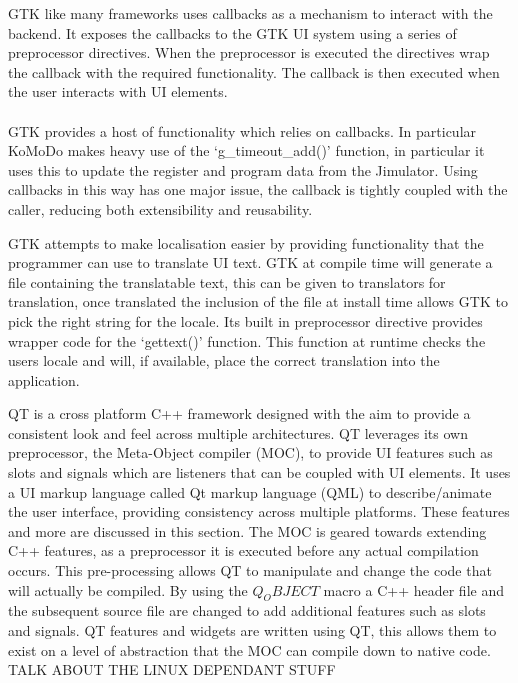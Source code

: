   GTK like many frameworks uses callbacks as a mechanism to interact with the backend. It exposes the callbacks to the GTK UI system using a series of preprocessor directives. When the preprocessor is executed the directives wrap the callback with the required functionality. The callback is then executed when the user interacts with UI elements.\\\\
  GTK provides a host of functionality which relies on callbacks. In particular KoMoDo makes heavy use of the `g\_timeout\_add()' function, in particular it uses this to update the register and program data from the Jimulator. Using callbacks in this way has one major issue, the callback is tightly coupled with the caller, reducing both extensibility and reusability.

  GTK attempts to make localisation easier by providing functionality that the programmer can use to translate UI text. GTK at compile time will generate a file containing the translatable text, this can be given to translators for translation, once translated the inclusion of the file at install time allows GTK to pick the right string for the locale. Its built in preprocessor directive provides wrapper code for the `gettext()' function. This function at runtime checks the users locale and will, if available, place the correct translation into the application.


  QT is a cross platform C++ framework designed with the aim to provide a consistent look and feel across multiple architectures. QT leverages its own preprocessor, the Meta-Object compiler (MOC), to provide UI features such as slots and signals which are listeners that can be coupled with UI elements. It uses a UI markup language called Qt markup language (QML) to describe/animate the user interface, providing consistency across multiple platforms. These features and more are discussed in this section.
  The MOC is geared towards extending C++ features, as a preprocessor it is executed before any actual compilation occurs. This pre-processing allows QT to manipulate and change the code that will actually be compiled. By using the $Q_OBJECT$ macro a C++ header file and the subsequent source file are changed to add additional features such as slots and signals. QT features and widgets are written using QT, this allows them to exist on a level of abstraction that the MOC can compile down to native code. TALK ABOUT THE LINUX DEPENDANT STUFF

